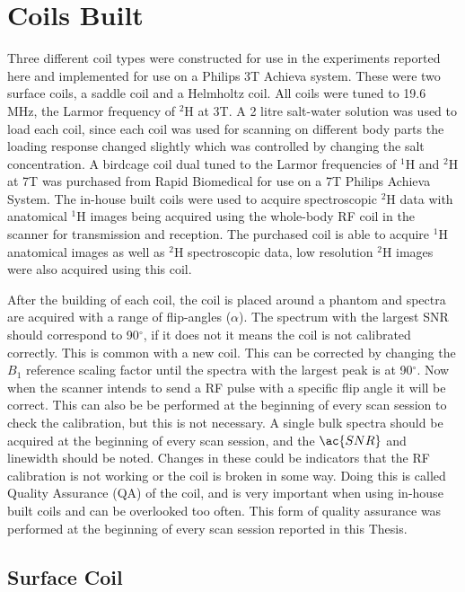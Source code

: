 \section{Coils Built}

Three different coil types were constructed for use in the experiments reported here and implemented for use on a Philips 3T Achieva system. These were two surface coils, a saddle coil and a Helmholtz coil. All coils were tuned to 19.6 MHz, the Larmor frequency of $^2$H at 3T. A 2 litre salt-water solution was used to load each coil, since each coil was used for scanning on different body parts the loading response changed slightly which was controlled by changing the salt concentration. A birdcage coil dual tuned to the Larmor frequencies of $^1$H and $^2$H at 7T was purchased from Rapid Biomedical for use on a 7T Philips Achieva System. The in-house built coils were used to acquire spectroscopic $^2$H data with anatomical $^1$H images being acquired using the whole-body \ac{RF} coil in the scanner for transmission and reception. The purchased coil is able to acquire $^1$H anatomical images as well as $^2$H spectroscopic data, low resolution $^2$H images were also acquired using this coil.

After the building of each coil, the coil is placed around a phantom and spectra are acquired with a range of flip-angles ($\alpha$). The spectrum with the largest \ac{SNR} should correspond to 90$^\circ$, if it does not it means the coil is not calibrated correctly. This is common with a new coil. This can be corrected by changing the $B_1$ reference scaling factor until the spectra with the largest peak is at 90$^\circ$. Now when the scanner intends to send a \ac{RF} pulse with a specific flip angle it will be correct. This can also be be performed at the beginning of every scan session to check the calibration, but this is not necessary. A single bulk spectra should be acquired at the beginning of every scan session,  and  the $\ac{SNR}$ and linewidth should be noted. Changes in these could be indicators that the \ac{RF} calibration is not working or the coil is broken in some way. Doing this is called Quality Assurance (QA) of the coil, and is very important when using in-house built coils and can be overlooked too often. This form of quality assurance was performed at the beginning of every scan session reported in this Thesis.

\subsection{Surface Coil}

